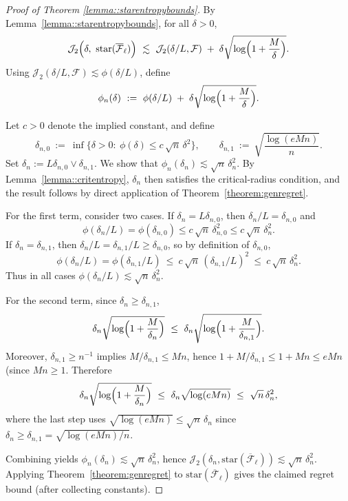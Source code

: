 \documentclass[11pt]{article}
\theoremstyle{plain}
\theoremstyle{definition} %
\begin{document}
\begin{proof}[Proof of Theorem \ref{lemma::starentropybounds}]
By Lemma~\ref{lemma::starentropybounds}, for all \(\delta>0\),
\[
\mathcal J_2\Bigl(\delta,\ \mathrm{star}(\overline{\mathcal F}_\ell)\Bigr)
\ \lesssim\
\mathcal J_2(\delta/L,\mathcal F)\;+\;\delta\sqrt{\log\Bigl(1+\frac{M}{\delta}\Bigr)}.
\]
Using \(\mathcal J_2(\delta/L,\mathcal F)\lesssim \phi(\delta/L)\), define
\[
\phi_n(\delta)\ :=\ \phi(\delta/L)\;+\;\delta\sqrt{\log\Bigl(1+\frac{M}{\delta}\Bigr)}.
\]



Let \(c>0\) denote the implied constant, and define
\[
\delta_{n,0}\ :=\ \inf\bigl\{\delta>0:\ \phi(\delta)\le c\,\sqrt n\,\delta^2\bigr\},
\qquad
\delta_{n,1}\ :=\ \sqrt{\frac{\log(eMn)}{n}}.
\]
Set \(\delta_n:= L\delta_{n,0}\vee \delta_{n,1}\). We show that
\(\phi_n(\delta_n)\lesssim \sqrt n\,\delta_n^2\).
By Lemma~\ref{lemma::critentropy}, \(\delta_n\) then satisfies the critical-radius condition, and the result follows by direct application of Theorem~\ref{theorem:genregret}.

For the first term, consider two cases.
If \(\delta_n=L\delta_{n,0}\), then \(\delta_n/L=\delta_{n,0}\) and
\[
\phi(\delta_n/L)=\phi(\delta_{n,0})\le c\,\sqrt n\,\delta_{n,0}^2\le c\,\sqrt n\,\delta_n^2.
\]
If \(\delta_n=\delta_{n,1}\), then \(\delta_n/L=\delta_{n,1}/L\ge \delta_{n,0}\), so by definition of \(\delta_{n,0}\),
\[
\phi(\delta_n/L)=\phi(\delta_{n,1}/L)\ \le\ c\,\sqrt n\,(\delta_{n,1}/L)^2\ \le\ c\,\sqrt n\,\delta_n^2.
\]
Thus in all cases \(\phi(\delta_n/L)\lesssim \sqrt n\,\delta_n^2\).

For the second term, since \(\delta_n\ge \delta_{n,1}\),
\[
\delta_n\sqrt{\log\Bigl(1+\frac{M}{\delta_n}\Bigr)}
\ \le\
\delta_n\sqrt{\log\Bigl(1+\frac{M}{\delta_{n,1}}\Bigr)}.
\]
Moreover, \(\delta_{n,1}\ge n^{-1}\) implies \(M/\delta_{n,1}\le Mn\), hence
\(1+M/\delta_{n,1}\le 1+Mn\le eMn\) (since \(Mn\ge 1\). Therefore
\[
\delta_n\sqrt{\log\Bigl(1+\frac{M}{\delta_n}\Bigr)}
\ \le\
\delta_n\sqrt{\log(eMn)}
\ \le\
\sqrt n\,\delta_n^2,
\]
where the last step uses \(\sqrt{\log(eMn)}\le \sqrt n\,\delta_n\) since \(\delta_n\ge \delta_{n,1}=\sqrt{\log(eMn)/n}\).

Combining yields \(\phi_n(\delta_n)\lesssim \sqrt n\,\delta_n^2\), hence
\(\mathcal J_2(\delta_n,\mathrm{star}(\overline{\mathcal F}_\ell))\lesssim \sqrt n\,\delta_n^2\).
Applying Theorem~\ref{theorem:genregret} to \(\mathrm{star}(\overline{\mathcal F}_\ell)\) gives the claimed regret bound (after collecting constants).



\end{proof}
\end{document}
